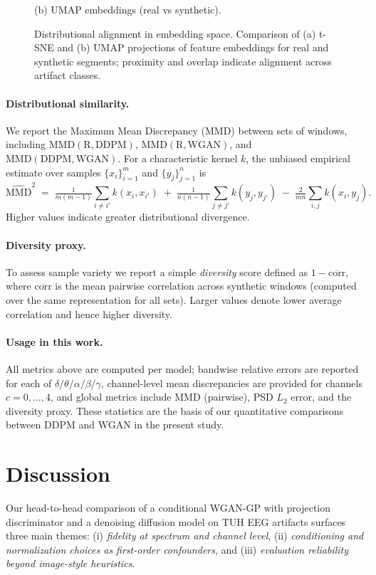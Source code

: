 \documentclass{article}
\begin{document}
\begin{figure}[t]
\begin{minipage}[t]{0.49\linewidth}
    \small (b) UMAP embeddings (real vs synthetic).
  \end{minipage}
  \caption{Distributional alignment in embedding space. Comparison of (a) t\mbox{-}SNE and (b) UMAP projections of feature embeddings for real and synthetic segments; proximity and overlap indicate alignment across artifact classes.}
  \label{fig:embed-tsne-umap}
\end{figure}


\paragraph{Distributional similarity.}
We report the Maximum Mean Discrepancy (MMD) between sets of windows, including $\mathrm{MMD}(\text{R},\text{DDPM})$, $\mathrm{MMD}(\text{R},\text{WGAN})$, and $\mathrm{MMD}(\text{DDPM},\text{WGAN})$. For a characteristic kernel $k$, the unbiased empirical estimate over samples $\{x_i\}_{i=1}^m$ and $\{y_j\}_{j=1}^n$ is
\[
\widehat{\mathrm{MMD}}^2 \;=\; \tfrac{1}{m(m-1)}\!\!\sum_{i\neq i'}\! k(x_i,x_{i'}) \;+\; \tfrac{1}{n(n-1)}\!\!\sum_{j\neq j'}\! k(y_j,y_{j'}) \;-\; \tfrac{2}{mn}\!\sum_{i,j}\! k(x_i,y_j).
\]
Higher values indicate greater distributional divergence.

\paragraph{Diversity proxy.}
To assess sample variety we report a simple \emph{diversity} score defined as $1 - \overline{\mathrm{corr}}$, where $\overline{\mathrm{corr}}$ is the mean pairwise correlation across synthetic windows (computed over the same representation for all sets). Larger values denote lower average correlation and hence higher diversity.

\paragraph{Usage in this work.}
All metrics above are computed per model; bandwise relative errors are reported for each of $\delta/\theta/\alpha/\beta/\gamma$, channel-level mean discrepancies are provided for channels $c\!=\!0,\dots,4$, and global metrics include $\mathrm{MMD}$ (pairwise), PSD $L_2$ error, and the diversity proxy. These statistics are the basis of our quantitative comparisons between DDPM and WGAN in the present study.


\section{Discussion}
Our head-to-head comparison of a conditional WGAN-GP with projection discriminator and a denoising diffusion model on TUH EEG artifacts surfaces three main themes: (i) \emph{fidelity at spectrum and channel level}, (ii) \emph{conditioning and normalization choices as first-order confounders}, and (iii) \emph{evaluation reliability beyond image-style heuristics}.
\end{document}
